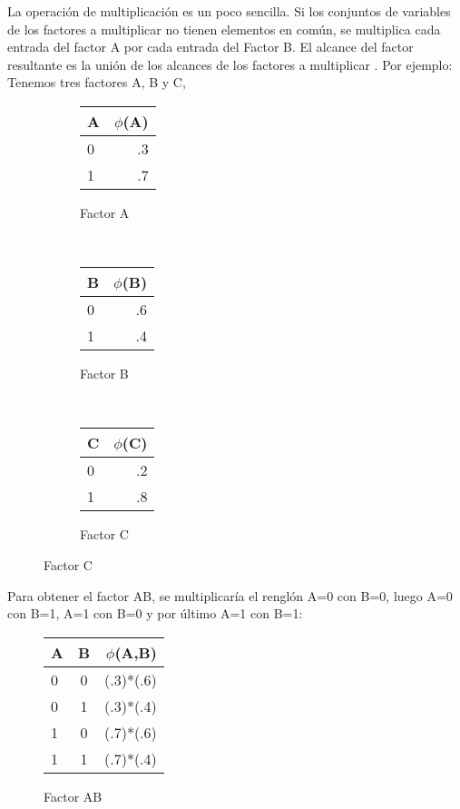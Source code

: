 La operación de multiplicación es un poco sencilla. Si los conjuntos de variables de los factores a multiplicar no tienen elementos en común, se multiplica cada entrada del factor A por cada entrada del Factor B. El alcance del factor resultante es la unión de los alcances de los factores a multiplicar \parencite[107]{KollerFriedman2009}. Por ejemplo: Tenemos tres factores A, B y C,


\begin{figure}[h!]
    \centering
    \begin{subfigure}[b]{0.3\textwidth}
        \centering
        \begin{tabular}{ l | r }
          A & $\phi$(A)\\ \hline
          0 & .3  \\ \hline
          1 & .7  \\
        \end{tabular}
        \caption{Factor A}
    \end{subfigure}
    ~ 
    \begin{subfigure}[b]{0.3\textwidth}
        \centering
        \begin{tabular}{ l | r }
          B & $\phi$(B)\\ \hline
          0 & .6  \\ \hline
          1 & .4  \\
        \end{tabular}
        \caption{Factor B}
    \end{subfigure}
    ~
    \begin{subfigure}[b]{0.3\textwidth}
        \centering
        \begin{tabular}{ l | r }
          C & $\phi$(C)\\ \hline
          0 & .2  \\ \hline
          1 & .8  \\
        \end{tabular}
        \caption{Factor C}
    \end{subfigure}
\end{figure}

\noindent Para obtener el factor AB, se multiplicaría el renglón A=0 con B=0, luego A=0 con B=1, A=1 con B=0 y por último A=1 con B=1:

\begin{figure}[H]
  \begin{center}
    \begin{tabular}{ l  c | r }
      A & B & $\phi$(A,B)\\ \hline
      0 & 0 & (.3)*(.6)  \\ \hline
      0 & 1 & (.3)*(.4)  \\ \hline
      1 & 0 & (.7)*(.6)  \\ \hline
      1 & 1 & (.7)*(.4)  \\
    \end{tabular}
  \end{center}
  \caption{Factor AB}
\end{figure}

